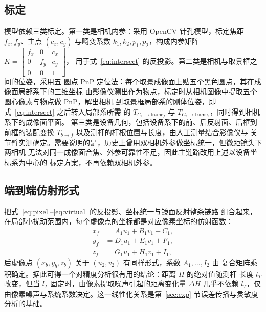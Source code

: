 \subsection{标定}
\label{subsec:calib}

模型依赖三类标定。第一类是相机内参：采用 OpenCV 针孔模型，标定焦距
$f_x,f_y$、主点 $(c_x,c_y)$ 与畸变系数 $k_1,k_2,p_1,p_2$，构成内参矩阵
$K=\left[\begin{smallmatrix} f_x&0&c_x\\ 0&f_y&c_y\\ 0&0&1\end{smallmatrix}\right]$，
用于式~\eqref{eq:intersect} 的反投影。第二类是相机与取景框之间的位姿，采用五
圆点 PnP 定位法：每个取景成像面上贴五个黑色圆点，其在成像面局部系下的三维坐标
由影像仪测出作为物点，标定时从相机图像中提取五个圆心像素与物点做 PnP，解出相机
到取景框局部系的刚体位姿，即式~\eqref{eq:intersect} 之后转入局部系所需
的 $T_{C_1\to\text{frame}_f}$ 与 $T_{C_2\to\text{frame}_b}$，同时得到相机系下的成像面平面。
第三类是设备几何，包括设备系下的前、后反射面、后框到前框的装配变换 $T_{b\to f}$
以及测杆的杆根位置与长度，由人工测量结合影像仪与
关节臂实测确定。需要说明的是，历史上曾用双相机外参做坐标统一，但微距镜头下两相机
无法对同一成像面合焦、外参可靠性不足，因此主链路改用上述以设备坐标系为中心的
标定方案，不再依赖双相机外参。

\subsection{端到端仿射形式}

把式~\eqref{eq:pixel}--\eqref{eq:virtual} 的反投影、坐标统一与镜面反射整条链路
组合起来，在局部小扰动范围内，每个虚像点的坐标都是对应像素坐标的仿射函数：
\begin{equation}
\label{eq:affine_f}
\begin{aligned}
x_f &= A_1 u_1 + B_1 v_1 + C_1, \\
y_f &= D_1 u_1 + E_1 v_1 + F_1, \\
z_f &= G_1 u_1 + H_1 v_1 + I_1,
\end{aligned}
\end{equation}
后虚像点 $(x_b,y_b,z_b)$ 关于 $(u_2,v_2)$ 有同样形式，系数 $A_1,\dots,I_2$ 由
复合矩阵乘积确定。据此可得一个对精度分析很有用的结论：距离 $H$ 的绝对值随测杆
长度 $l_T$ 改变，但当 $l_T$ 固定时，由像素提取噪声引起的距离变化量 $\Delta H$
几乎不依赖 $l_T$，仅由像素噪声与系统系数决定。这一线性化关系是第~\ref{sec:exp}
节误差传播与灵敏度分析的基础。
